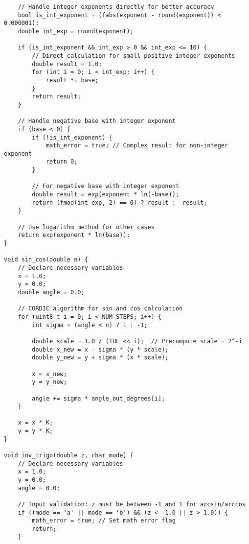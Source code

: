 \documentclass{article}
\begin{document}
\begin{verbatim}
    // Handle integer exponents directly for better accuracy
    bool is_int_exponent = (fabs(exponent - round(exponent)) < 0.000001);
    double int_exp = round(exponent);
    
    if (is_int_exponent && int_exp > 0 && int_exp <= 10) {
        // Direct calculation for small positive integer exponents
        double result = 1.0;
        for (int i = 0; i < int_exp; i++) {
            result *= base;
        }
        return result;
    }
    
    // Handle negative base with integer exponent
    if (base < 0) {
        if (!is_int_exponent) {
            math_error = true; // Complex result for non-integer exponent
            return 0;
        }
        
        // For negative base with integer exponent
        double result = exp(exponent * ln(-base));
        return (fmod(int_exp, 2) == 0) ? result : -result;
    }
    
    // Use logarithm method for other cases
    return exp(exponent * ln(base));
}

void sin_cos(double n) {
    // Declare necessary variables
    x = 1.0;
    y = 0.0;
    double angle = 0.0;
    
    // CORDIC algorithm for sin and cos calculation
    for (uint8_t i = 0; i < NUM_STEPS; i++) {
        int sigma = (angle < n) ? 1 : -1;

        double scale = 1.0 / (1UL << i);  // Precompute scale = 2^-i
        double x_new = x - sigma * (y * scale);
        double y_new = y + sigma * (x * scale);

        x = x_new;
        y = y_new;

        angle += sigma * angle_out_degrees[i];
    }

    x = x * K;
    y = y * K;
}

void inv_trigo(double z, char mode) {
    // Declare necessary variables
    x = 1.0;
    y = 0.0;
    angle = 0.0;
    
    // Input validation: z must be between -1 and 1 for arcsin/arccos
    if ((mode == 'a' || mode == 'b') && (z < -1.0 || z > 1.0)) {
        math_error = true; // Set math error flag
        return;
    }
    

\end{verbatim}
\end{document}
